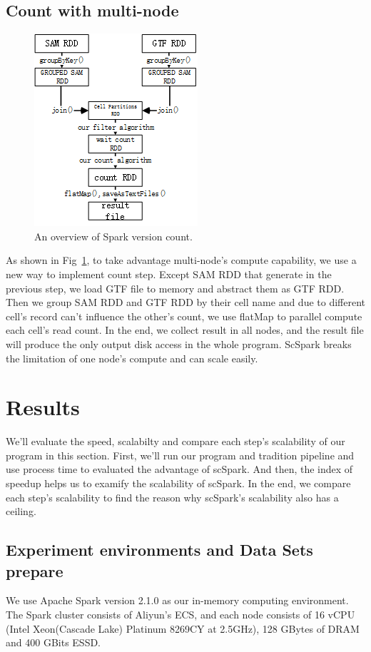 \documentclass[runningheads]{llncs}
\begin{document}
\subsection{Count with multi-node}
\begin{figure}
  \centering
  \includegraphics{fig3.png}
  \caption{An overview of Spark version count.} \label{fig3}
\end{figure}
As shown in Fig~\ref{fig3}, to take advantage multi-node's compute capability, we use a new way to implement count step.
Except SAM RDD that generate in the previous step, we load GTF file to memory and abstract them as GTF RDD.
Then we group SAM RDD and GTF RDD by their cell name and due to different cell's record can't influence the other's count, we use flatMap to parallel compute each cell's read count.
In the end, we collect result in all nodes, and the result file will produce the only output disk access in the whole program.
ScSpark breaks the limitation of one node's compute and can scale easily.

\section{Results}
We'll evaluate the speed, scalabilty and compare each step's scalability of our program in this section.
First, we'll run our program and tradition pipeline and use process time to evaluated the advantage of scSpark.
And then, the index of speedup helps us to examify the scalability of scSpark.
In the end, we compare each step's scalability to find the reason why scSpark's scalability also has a ceiling.
\subsection{Experiment environments and Data Sets prepare}
We use Apache Spark version 2.1.0 as our in-memory computing environment.
The Spark cluster consists of Aliyun's ECS, and each node consists of 16 vCPU
(Intel Xeon(Cascade Lake) Platinum 8269CY at 2.5GHz), 128 GBytes of DRAM and 400 GBits ESSD.
\end{document}
